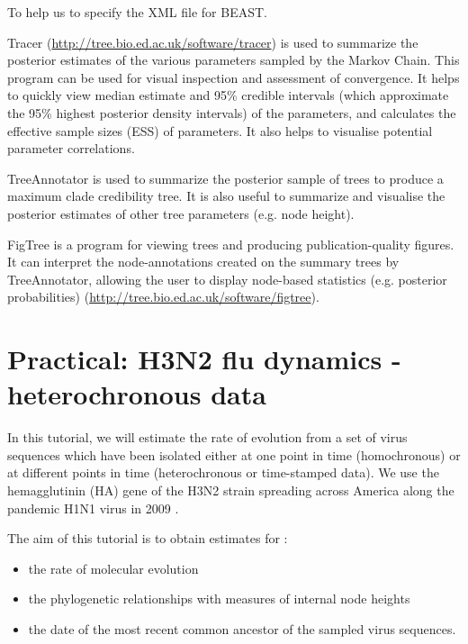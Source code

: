 \documentclass[11pt]{article}
\begin{document}
To help us to specify the XML file for BEAST.


Tracer (\url{http://tree.bio.ed.ac.uk/software/tracer}) is used to summarize the posterior estimates of the various parameters sampled by the Markov Chain. This program can be used for visual inspection and assessment of convergence. It helps to quickly view median estimate and 95\% credible intervals (which approximate the 95\% highest posterior density intervals) of the parameters, and calculates the effective sample sizes (ESS) of parameters. It also helps to visualise potential parameter correlations.


TreeAnnotator is used to summarize the posterior sample of trees to produce a maximum clade credibility tree. It is also useful to summarize and visualise the posterior estimates of other tree parameters (e.g. node height). 


FigTree is a program for viewing trees and producing publication-quality figures. It can interpret the node-annotations created on the summary trees by TreeAnnotator, allowing the user to display node-based statistics (e.g. posterior probabilities) (\url{http://tree.bio.ed.ac.uk/software/figtree}).



\newpage
\section{Practical: H3N2 flu dynamics - heterochronous data}\label{heterochronous}
In this tutorial, we will estimate the rate of evolution from a set of virus sequences which have been isolated either at one point in time (homochronous) or at different points in time (heterochronous or time-stamped data). We use the hemagglutinin (HA) gene of the H3N2 strain spreading across America along the pandemic H1N1 virus in 2009 \citep{cdc2009}. 

The aim of this tutorial is to obtain estimates for : 
\begin{itemize}
 	\item the rate of molecular evolution
	\item the phylogenetic relationships with measures of internal node heights
	\item the date of the most recent common ancestor of the sampled virus sequences.
\end{itemize}
\end{document}
